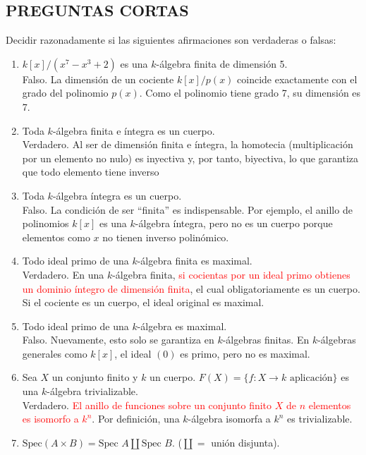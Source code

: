 \subsection*{PREGUNTAS CORTAS}
Decidir razonadamente si las siguientes afirmaciones son verdaderas o falsas:

\begin{enumerate}
    \item $k[x]/(x^{7}-x^{3}+2)$ es una $k$-álgebra finita de dimensión 5. \\    
    Falso. La dimensión de un cociente $k[x]/p(x)$ coincide exactamente con el grado del polinomio $p(x)$. Como el polinomio tiene grado 7, su dimensión es 7.
    \item Toda $k$-álgebra finita e íntegra es un cuerpo. \\   
    Verdadero. Al ser de dimensión finita e íntegra, la homotecia (multiplicación por un elemento no nulo) es inyectiva y, por tanto, biyectiva, lo que garantiza que todo elemento tiene inverso
    \item Toda $k$-álgebra íntegra es un cuerpo. \\
    Falso. La condición de ser ``finita'' es indispensable. Por ejemplo, el anillo de polinomios $k[x]$ es una $k$-álgebra íntegra, pero no es un cuerpo porque elementos como $x$ no tienen inverso polinómico.
    \item Todo ideal primo de una $k$-álgebra finita es maximal. \\
    Verdadero. En una $k$-álgebra finita, \textcolor{red}{si cocientas por un ideal primo obtienes un dominio íntegro de dimensión finita}, el cual obligatoriamente es un cuerpo. Si el cociente es un cuerpo, el ideal original es maximal.
    \item Todo ideal primo de una $k$-álgebra es maximal. \\
    Falso. Nuevamente, esto solo se garantiza en $k$-álgebras finitas. En $k$-álgebras generales como $k[x]$, el ideal $(0)$ es primo, pero no es maximal.
    \item Sea $X$ un conjunto finito y $k$ un cuerpo. $F(X)=\{f:X\rightarrow k \text{ aplicación}\}$ es una $k$-álgebra trivializable. \\
    Verdadero. \textcolor{red}{El anillo de funciones sobre un conjunto finito $X$ de $n$ elementos es isomorfo a $k^n$}. Por definición, una $k$-álgebra isomorfa a $k^n$ es trivializable.
    \item $\text{Spec}(A\times B) = \text{Spec } A \coprod \text{Spec } B$. ($\coprod = $ unión disjunta). \\

\end{enumerate}

